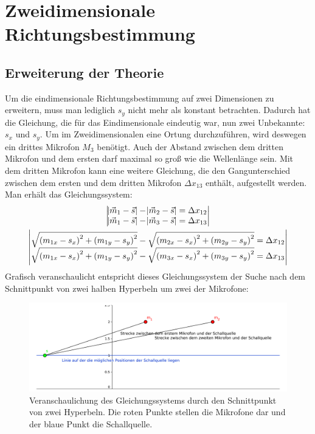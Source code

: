 \section{Zweidimensionale Richtungsbestimmung}
\subsection{Erweiterung der Theorie}
Um die eindimensionale Richtungsbestimmung auf zwei Dimensionen zu erweitern, muss man lediglich $s_y$ nicht mehr als konstant betrachten. Dadurch hat die Gleichung, die für das Eindimensionale eindeutig war, nun zwei Unbekannte: $s_x$ und $s_y$. Um im Zweidimensionalen eine Ortung durchzuführen, wird deswegen ein drittes Mikrofon $M_3$ benötigt. Auch der Abstand zwischen dem dritten Mikrofon und dem ersten darf maximal so groß wie die Wellenlänge sein. Mit dem dritten Mikrofon kann eine weitere Gleichung, die den Gangunterschied zwischen dem ersten und dem dritten Mikrofon $\Delta{x_{13}}$ enthält, aufgestellt werden. Man erhält das Gleichungssystem:
\begin{gather}\begin{vmatrix}
  \abs{\vec{m}_1 - \vec{s}} - \abs{\vec{m}_2 - \vec{s}} = \Delta{x_{12}} \\
  \abs{\vec{m}_1 - \vec{s}} - \abs{\vec{m}_3 - \vec{s}} = \Delta{x_{13}}
\end{vmatrix}\\
\begin{vmatrix}
  \sqrt{{(m_{1x} - s_x)}^2 + {(m_{1y} - s_y)}^2} - \sqrt{{(m_{2x} - s_x)}^2 + {(m_{2y} - s_y)}^2} = \Delta{x_{12}} \\
  \sqrt{{(m_{1x} - s_x)}^2 + {(m_{1y} - s_y)}^2} - \sqrt{{(m_{3x} - s_x)}^2 + {(m_{3y} - s_y)}^2} = \Delta{x_{13}}
\end{vmatrix}
\end{gather}
Grafisch veranschaulicht entspricht dieses Gleichungssystem der Suche nach dem Schnittpunkt von zwei halben Hyperbeln um zwei der Mikrofone:
\begin{figure}[H]
	\vspace{-20pt}
  \includegraphics[width=\linewidth]{img/skizze1d}
  \caption{Veranschaulichung des Gleichungssystems durch den Schnittpunkt von zwei Hyperbeln. Die roten Punkte stellen die Mikrofone dar und der blaue Punkt die Schallquelle.}
\end{figure}

